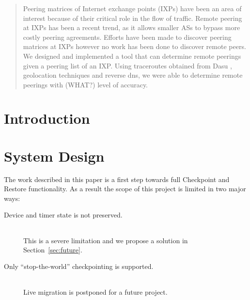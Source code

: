 \documentclass{acm_proc_article-sp}
\begin{document}
\maketitle
\begin{abstract}
Peering matrices of Internet exchange points (IXPs) have been an area of interest because of their
critical role in the flow of traffic. \cite{Augustin:2009}
Remote peering at IXPs has been a recent trend, as it allows smaller ASs to bypass more costly 
peering agreements.
Efforts have been made to discover peering matrices at IXPs however no work has been done 
to discover remote peers. We designed and implemented a tool that can determine remote peerings
given a peering list of an IXP. Using traceroutes obtained from Dasu \cite{Sanchez:2011}, geolocation
techniques and reverse dns, we were able to determine remote peerings with 
(WHAT?) level of accuracy.
\end{abstract}




\section{Introduction}

\section{System Design}

The work described in this paper is a first step towards full Checkpoint and Restore functionality. As a result the scope of this project is limited in two major ways:
\begin{description}
\item[Device and timer state is not preserved.]\hfill\\
This is a severe limitation and we propose a solution in Section~\ref{sec:future}.
\item[Only ``stop-the-world'' checkpointing is supported.]\hfill\\
Live migration is postponed for a future project.
\end{description}
\end{document}
